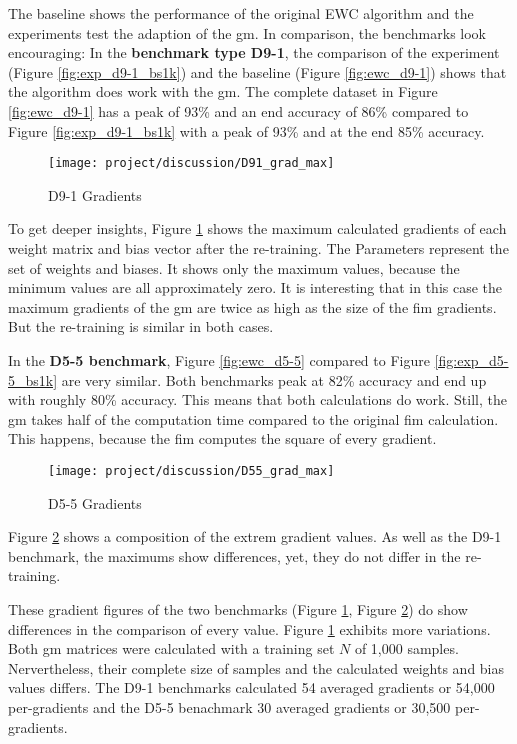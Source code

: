 The baseline shows the performance of the original EWC algorithm and the experiments test the adaption of the \acrlong{gm}.
In comparison, the benchmarks look encouraging:
\newline
In the \textbf{benchmark type D9-1}, the comparison of the experiment (Figure \ref{fig:exp_d9-1_bs1k}) and the baseline (Figure \ref{fig:ewc_d9-1}) shows that the algorithm does work with the \acrshort{gm}.
The complete dataset in Figure \ref{fig:ewc_d9-1} has a peak of 93\% and an end accuracy of 86\% compared to Figure \ref{fig:exp_d9-1_bs1k} with a peak of 93\% and at the end 85\% accuracy.

\begin{figure}[H]
    \centering
    \texttt{[image: project/discussion/D91\_grad\_max]}
    \caption{D9-1 Gradients}
    \label{fig:dis_d91}
\end{figure}

To get deeper insights, Figure \ref{fig:dis_d91} shows the maximum calculated gradients of each weight matrix and bias vector after the re-training.
The Parameters represent the set of weights and biases.
It shows only the maximum values, because the minimum values are all approximately zero.
It is interesting that in this case the maximum gradients of the \acrshort{gm} are twice as high as the size of the \acrshort{fim} gradients.
But the re-training is similar in both cases.

In the \textbf{D5-5 benchmark}, Figure \ref{fig:ewc_d5-5} compared to Figure \ref{fig:exp_d5-5_bs1k} are very similar.
Both benchmarks peak at 82\% accuracy and end up with roughly 80\% accuracy.
This means that both calculations do work.
Still, the \acrshort{gm} takes half of the computation time compared to the original \acrshort{fim} calculation.
This happens, because the \acrshort{fim} computes the square of every gradient.

\begin{figure}[H]
    \centering
    \texttt{[image: project/discussion/D55\_grad\_max]}
    \caption{D5-5 Gradients}
    \label{fig:dis_d55}
\end{figure}

Figure \ref{fig:dis_d55} shows a composition of the extrem gradient values.
As well as the D9-1 benchmark, the maximums show differences, yet, they do not differ in the re-training.

These gradient figures of the two benchmarks (Figure \ref{fig:dis_d91}, Figure \ref{fig:dis_d55}) do show differences in the comparison of every value.
Figure \ref{fig:dis_d91} exhibits more variations.
Both \acrshort{gm} matrices were calculated with a training set $N$ of 1,000 samples.
Nervertheless, their complete size of samples and the calculated weights and bias values differs.
The D9-1 benchmarks calculated 54 averaged gradients or 54,000 per-gradients and the D5-5 benachmark 30 averaged gradients or 30,500 per-gradients.

